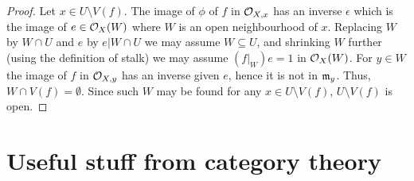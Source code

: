 \documentclass[a4paper,parskip=half,numbers=enddot, DIV=12]{scrreprt}
\begin{document}
\begin{proof}
    Let $x\in U\setminus V(f)$. The image of $\phi$ of $f$ in $\mathcal{O}_{X,x}$ has an inverse $\epsilon$ which is the image of $e\in \mathcal{O}_X(W)$ where $W$ is an open neighbourhood of $x$. Replacing $W$ by $W\cap U$ and $e$ by $e|{W\cap U}$  we may assume $W\subseteq U$, and shrinking $W$ further (using the definition of stalk) we may assume $(f|_W) e = 1$ in $\mathcal{O}_X(W)$. For $y\in W$ the image of $f$ in $\mathcal{O}_{X,y}$ has an inverse given $e$, hence it is not in $\mathfrak{m}_y$. Thus, $W\cap V(f) = \emptyset$. Since such $W$ may be found for any $x\in U\setminus V(f)$, $U\setminus V(f)$ is open.
\end{proof}

    
    
    
    \appendix
    \chapter{Useful stuff from category theory}
\end{document}
